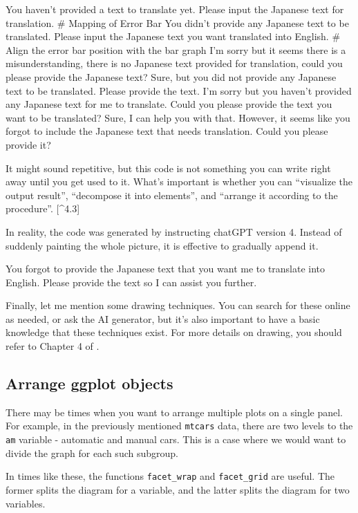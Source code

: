 \documentclass[
  a4paper,
]{book}
\begin{document}
You haven't provided a text to translate yet. Please input the Japanese
text for translation. \# Mapping of Error Bar You didn't provide any
Japanese text to be translated. Please input the Japanese text you want
translated into English. \# Align the error bar position with the bar
graph I'm sorry but it seems there is a misunderstanding, there is no
Japanese text provided for translation, could you please provide the
Japanese text? Sure, but you did not provide any Japanese text to be
translated. Please provide the text. I'm sorry but you haven't provided
any Japanese text for me to translate. Could you please provide the text
you want to be translated? Sure, I can help you with that. However, it
seems like you forgot to include the Japanese text that needs
translation. Could you please provide it?

It might sound repetitive, but this code is not something you can write
right away until you get used to it. What's important is whether you can
``visualize the output result'', ``decompose it into elements'', and
``arrange it according to the procedure''. {[}\^{}4.3{]}

In reality, the code was generated by instructing chatGPT version 4.
Instead of suddenly painting the whole picture, it is effective to
gradually append it.

You forgot to provide the Japanese text that you want me to translate
into English. Please provide the text so I can assist you further.

Finally, let me mention some drawing techniques. You can search for
these online as needed, or ask the AI generator, but it's also important
to have a basic knowledge that these techniques exist. For more details
on drawing, you should refer to Chapter 4 of \textcite{Kinosady2021}.

\subsection{Arrange ggplot objects}\label{arrange-ggplot-objects}

There may be times when you want to arrange multiple plots on a single
panel. For example, in the previously mentioned \texttt{mtcars} data,
there are two levels to the \texttt{am} variable - automatic and manual
cars. This is a case where we would want to divide the graph for each
such subgroup.

In times like these, the functions \texttt{facet\_wrap} and
\texttt{facet\_grid} are useful. The former splits the diagram for a
variable, and the latter splits the diagram for two variables.
\end{document}
